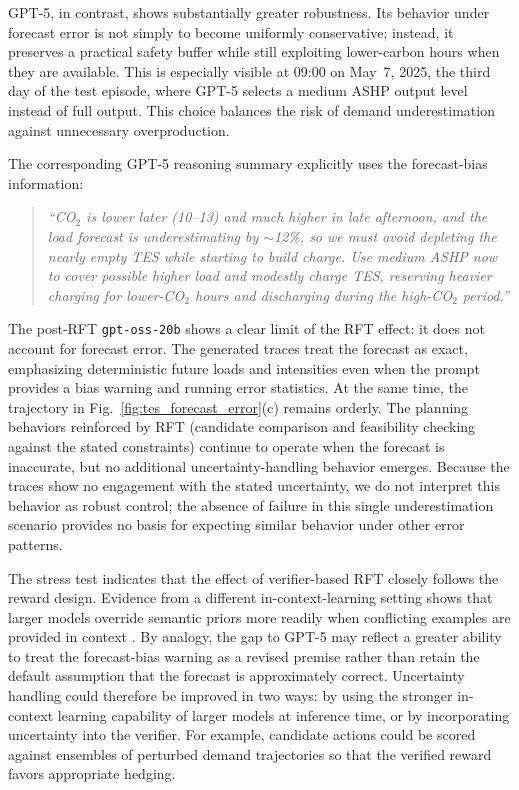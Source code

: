 \documentclass[11pt]{article}
\begin{document}
GPT-5, in contrast, shows substantially greater robustness. Its behavior under forecast error is not simply to become uniformly conservative; instead, it preserves a practical safety buffer while still exploiting lower-carbon hours when they are available. This is especially visible at 09:00 on May~7, 2025, the third day of the test episode, where GPT-5 selects a medium ASHP output level instead of full output. This choice balances the risk of demand underestimation against unnecessary overproduction.

The corresponding GPT-5 reasoning summary explicitly uses the forecast-bias information:
\begin{quote}
\small\itshape
``CO$_2$ is lower later (10--13) and much higher in late afternoon, and the load forecast is underestimating by $\sim$12\%, so we must avoid depleting the nearly empty TES while starting to build charge. Use medium ASHP now to cover possible higher load and modestly charge TES, reserving heavier charging for lower-CO$_2$ hours and discharging during the high-CO$_2$ period.''
\end{quote}

The post-RFT \texttt{gpt-oss-20b} shows a clear limit of the RFT effect: it does not account for forecast error. The generated traces treat the forecast as exact, emphasizing deterministic future loads and intensities even when the prompt provides a bias warning and running error statistics. At the same time, the trajectory in Fig.~\ref{fig:tes_forecast_error}(c) remains orderly. The planning behaviors reinforced by RFT (candidate comparison and feasibility checking against the stated constraints) continue to operate when the forecast is inaccurate, but no additional uncertainty-handling behavior emerges. Because the traces show no engagement with the stated uncertainty, we do not interpret this behavior as robust control; the absence of failure in this single underestimation scenario provides no basis for expecting similar behavior under other error patterns.

The stress test indicates that the effect of verifier-based RFT closely follows the reward design. Evidence from a different in-context-learning setting shows that larger models override semantic priors more readily when conflicting examples are provided in context \cite{ref:wei2023_icl_differently}. By analogy, the gap to GPT-5 may reflect a greater ability to treat the forecast-bias warning as a revised premise rather than retain the default assumption that the forecast is approximately correct. Uncertainty handling could therefore be improved in two ways: by using the stronger in-context learning capability of larger models at inference time, or by incorporating uncertainty into the verifier. For example, candidate actions could be scored against ensembles of perturbed demand trajectories so that the verified reward favors appropriate hedging.
\end{document}
